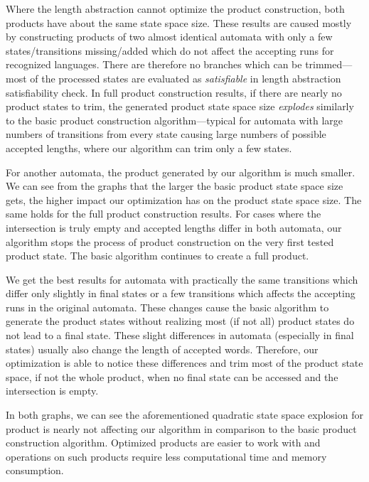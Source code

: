 Where the length abstraction cannot optimize the product construction, both products have about the same state space size. These results are caused mostly by constructing products of two almost identical automata with only a few states/transitions missing/added which do not affect the accepting runs for recognized languages. There are therefore no branches which can be trimmed---most of the processed states are evaluated as \emph{satisfiable} in length abstraction satisfiability check. In full product construction results, if there are nearly no product states to trim, the generated product state space size \emph{explodes} similarly to the basic product construction algorithm---typical for automata with large numbers of transitions from every state causing large numbers of possible accepted lengths, where our algorithm can trim only a few states.

For another automata, the product generated by our algorithm is much smaller. We can see from the graphs that the larger the basic product state space size gets, the higher impact our optimization has on the product state space size. The same holds for the full product construction results. For cases where the intersection is truly empty and accepted lengths differ in both automata, our algorithm stops the process of product construction on the very first tested product state. The basic algorithm continues to create a full product.

We get the best results for automata with practically the same transitions which differ only slightly in final states or a few transitions which affects the accepting runs in the original automata. These changes cause the basic algorithm to generate the product states without realizing most (if not all) product states do not lead to a final state. These slight differences in automata (especially in final states) usually also change the length of accepted words. Therefore, our optimization is able to notice these differences and trim most of the product state space, if not the whole product, when no final state can be accessed and the intersection is empty.

In both graphs, we can see the aforementioned quadratic state space explosion for product is nearly not affecting our algorithm in comparison to the basic product construction algorithm. Optimized products are easier to work with and operations on such products require less computational time and memory consumption.

